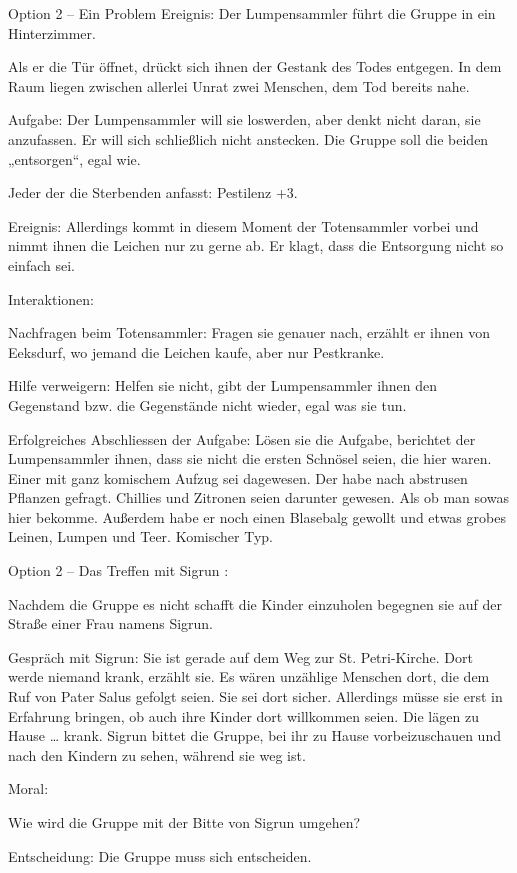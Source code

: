 Option 2 – Ein Problem
Ereignis: Der Lumpensammler führt die Gruppe in ein Hinterzimmer.

Als er die Tür öffnet, drückt sich ihnen der Gestank des Todes entgegen. In dem Raum liegen zwischen allerlei Unrat zwei Menschen, dem Tod bereits nahe.

Aufgabe: Der Lumpensammler will sie loswerden, aber denkt nicht daran, sie anzufassen. Er will sich schließlich nicht anstecken. Die Gruppe soll die beiden „entsorgen“, egal wie.

Jeder der die Sterbenden anfasst: Pestilenz +3.

Ereignis: Allerdings kommt in diesem Moment der Totensammler vorbei und nimmt ihnen die Leichen nur zu gerne ab. Er klagt, dass die Entsorgung nicht so einfach sei.

Interaktionen:

Nachfragen beim Totensammler: Fragen sie genauer nach, erzählt er ihnen von Eeksdurf, wo jemand die Leichen kaufe, aber nur Pestkranke.

Hilfe verweigern: Helfen sie nicht, gibt der Lumpensammler ihnen den Gegenstand bzw. die Gegenstände nicht wieder, egal was sie tun.


Erfolgreiches Abschliessen der Aufgabe: Lösen sie die Aufgabe, berichtet der Lumpensammler ihnen, dass sie nicht die ersten Schnösel seien, die hier waren. Einer mit ganz komischem Aufzug sei dagewesen. Der habe nach abstrusen Pflanzen gefragt. Chillies und Zitronen seien darunter gewesen. Als ob man sowas hier bekomme. Außerdem habe er noch einen Blasebalg gewollt und etwas grobes Leinen, Lumpen und Teer. Komischer Typ.

Option 2 – Das Treffen mit Sigrun
:

Nachdem die Gruppe es nicht schafft die Kinder einzuholen begegnen sie auf der Straße einer Frau namens Sigrun.

Gespräch mit Sigrun: Sie ist gerade auf dem Weg zur St. Petri-Kirche. Dort werde niemand krank, erzählt sie. Es wären unzählige Menschen dort, die dem Ruf von Pater Salus gefolgt seien. Sie sei dort sicher. Allerdings müsse sie erst in Erfahrung bringen, ob auch ihre Kinder dort willkommen seien. Die lägen zu Hause … krank. Sigrun bittet die Gruppe, bei ihr zu Hause vorbeizuschauen und nach den Kindern zu sehen, während sie weg ist.

Moral:

Wie wird die Gruppe mit der Bitte von Sigrun umgehen?

Entscheidung: Die Gruppe muss sich entscheiden.

